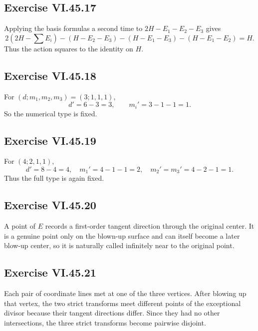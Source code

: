 \subsection*{Exercise VI.45.17}
\begin{solution}
Applying the basis formulas a second time to \(2H-E_1-E_2-E_3\) gives
\[
2(2H-\sum E_i)-(H-E_2-E_3)-(H-E_1-E_3)-(H-E_1-E_2)=H.
\]
Thus the action squares to the identity on \(H\).
\end{solution}

\subsection*{Exercise VI.45.18}
\begin{solution}
For \((d;m_1,m_2,m_3)=(3;1,1,1)\),
\[
d'=6-3=3,\qquad m_i'=3-1-1=1.
\]
So the numerical type is fixed.
\end{solution}

\subsection*{Exercise VI.45.19}
\begin{solution}
For \((4;2,1,1)\),
\[
d'=8-4=4,\quad m_1'=4-1-1=2,\quad m_2'=m_3'=4-2-1=1.
\]
Thus the full type is again fixed.
\end{solution}

\subsection*{Exercise VI.45.20}
\begin{solution}
A point of \(E\) records a first-order tangent direction through the original center.  It is a genuine point only on the blown-up surface and can itself become a later blow-up center, so it is naturally called infinitely near to the original point.
\end{solution}

\subsection*{Exercise VI.45.21}
\begin{solution}
Each pair of coordinate lines met at one of the three vertices.  After blowing up that vertex, the two strict transforms meet different points of the exceptional divisor because their tangent directions differ.  Since they had no other intersections, the three strict transforms become pairwise disjoint.
\end{solution}

